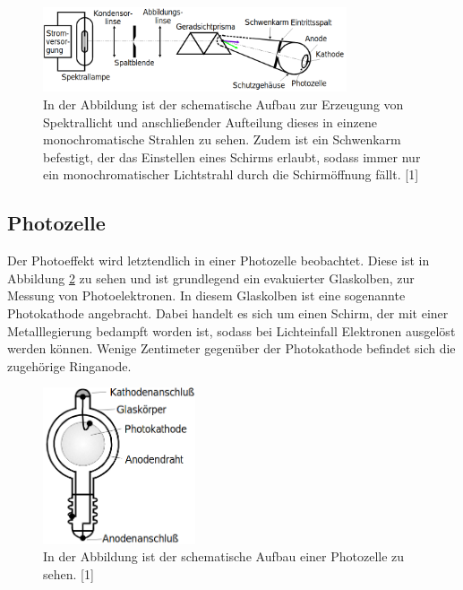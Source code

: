 \documentclass[titlepage = firstcover]{scrartcl}
\begin{document}
            \FloatBarrier

                \begin{figure}[h]
                  \centering
                  \includegraphics[width = 0.8\textwidth]{Bilder/Monolicht.png}
                  \caption{In der Abbildung ist der schematische Aufbau zur Erzeugung von Spektrallicht und anschließender Aufteilung dieses in einzene monochromatische Strahlen zu sehen. Zudem ist ein Schwenkarm befestigt, der das Einstellen eines Schirms erlaubt, sodass immer nur ein monochromatischer Lichtstrahl durch die Schirmöffnung fällt. [1]}
                  \label{fig:MonoLicht}
                \end{figure}

            \FloatBarrier

        \subsection{Photozelle}
            Der Photoeffekt wird letztendlich in einer Photozelle beobachtet. Diese ist in Abbildung \ref{fig:Photozelle} zu sehen und ist grundlegend ein evakuierter Glaskolben, zur Messung von Photoelektronen. In 
            diesem Glaskolben ist eine sogenannte Photokathode angebracht. Dabei handelt es sich um einen Schirm, der mit einer Metalllegierung bedampft worden ist, sodass bei Lichteinfall Elektronen 
            ausgelöst werden können. Wenige Zentimeter gegenüber der Photokathode befindet sich die zugehörige Ringanode.

            \FloatBarrier

                \begin{figure}[h]
                  \centering
                  \includegraphics[width = 0.4\textwidth]{Bilder/Photozelle.png}
                  \caption{In der Abbildung ist der schematische Aufbau einer Photozelle zu sehen. [1]}
                  \label{fig:Photozelle}
                \end{figure}
\end{document}
